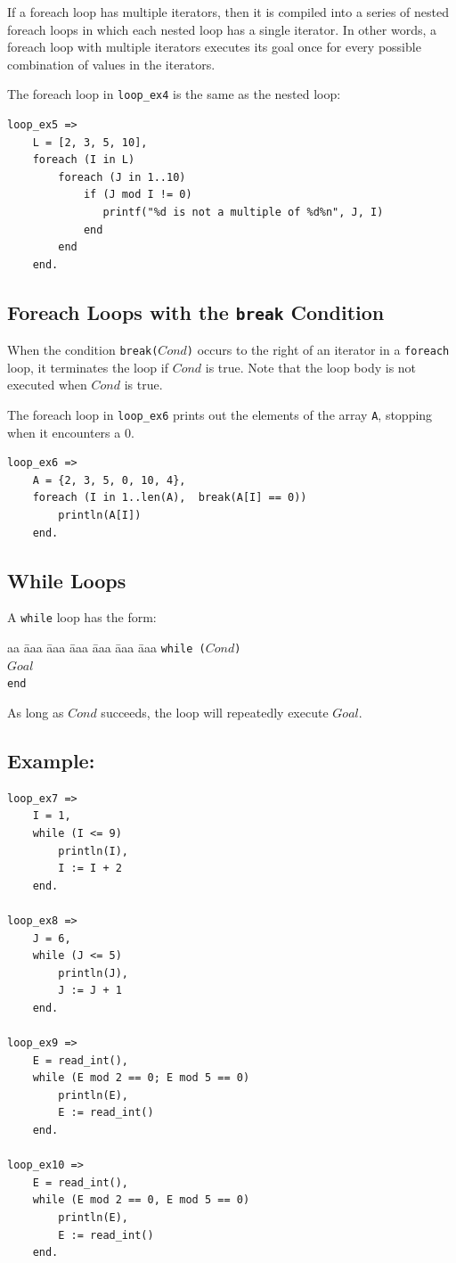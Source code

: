If a foreach loop has multiple iterators, then it is compiled into a series of nested foreach loops in which each nested loop has a single iterator.  In other words, a foreach loop with multiple iterators executes its goal once for every possible combination of values in the iterators.

The foreach loop in \texttt{loop\_ex4} is the same as the nested loop:
\begin{verbatim}
loop_ex5 =>
    L = [2, 3, 5, 10],
    foreach (I in L)
        foreach (J in 1..10)
            if (J mod I != 0)
               printf("%d is not a multiple of %d%n", J, I)
            end
        end
    end.
\end{verbatim}

\subsection{Foreach Loops with the \texttt{break} Condition}
When the condition \texttt{break($Cond$)} occurs to the right of an iterator in a \texttt{foreach} loop, it terminates the loop if $Cond$ is true. Note that the loop body is not executed when $Cond$ is true. 

The foreach loop in \texttt{loop\_ex6} prints out the elements of the array \texttt{A}, stopping when it encounters a 0.
\begin{verbatim}
loop_ex6 =>
    A = {2, 3, 5, 0, 10, 4},
    foreach (I in 1..len(A),  break(A[I] == 0))
        println(A[I])
    end.
\end{verbatim}


\subsection{While Loops}
A \texttt{while} loop has the form:
\begin{tabbing}
aa \= aaa \= aaa \= aaa \= aaa \= aaa \= aaa \kill
\> \texttt{while ($Cond$)} \\
\> \> $Goal$  \\
\>  \texttt{end}
\end{tabbing} 
As long as $Cond$ succeeds, the loop will repeatedly execute $Goal$.  
\subsection*{Example:}
\begin{verbatim}
loop_ex7 =>
    I = 1, 
    while (I <= 9)
        println(I),
        I := I + 2
    end.

loop_ex8 =>
    J = 6,
    while (J <= 5)
        println(J),
        J := J + 1
    end.

loop_ex9 =>
    E = read_int(),
    while (E mod 2 == 0; E mod 5 == 0)
        println(E),
        E := read_int()
    end.

loop_ex10 =>
    E = read_int(),
    while (E mod 2 == 0, E mod 5 == 0)
        println(E),
        E := read_int()
    end.
\end{verbatim}

